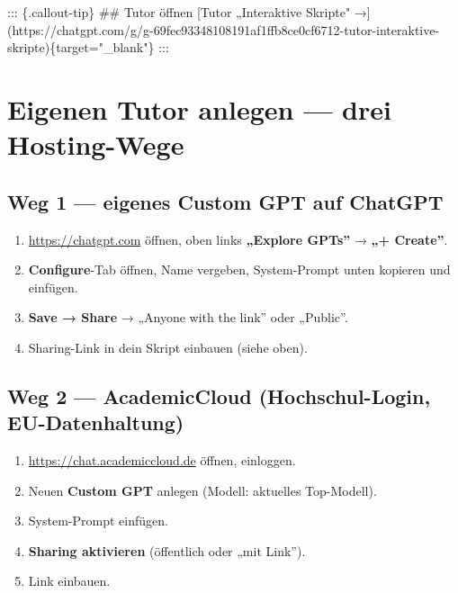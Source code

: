 \documentclass[
  ngerman,
  a4paper,
  DIV=11]{scrreprt}
\newenvironment{Shaded}{\begin{snugshade}}{\end{snugshade}}
\newcommand{\CommentTok}[1]{\textcolor[rgb]{0.37,0.37,0.37}{#1}}
\newcommand{\FunctionTok}[1]{\textcolor[rgb]{0.28,0.35,0.67}{#1}}
\newcommand{\NormalTok}[1]{\textcolor[rgb]{0.00,0.23,0.31}{#1}}
\newcommand{\OtherTok}[1]{\textcolor[rgb]{0.00,0.23,0.31}{#1}}
\providecommand{\tightlist}{%
  \setlength{\itemsep}{0pt}\setlength{\parskip}{0pt}}
\begin{document}
\begin{Shaded}
\begin{Highlighting}[]
\NormalTok{::: \{.callout{-}tip\}}
\FunctionTok{\#\# Tutor öffnen}
\CommentTok{[}\OtherTok{Tutor „Interaktive Skripte" →}\CommentTok{](https://chatgpt.com/g/g{-}69fec93348108191af1ffb8ce0cf6712{-}tutor{-}interaktive{-}skripte)}\NormalTok{\{target="\_blank"\}}
\NormalTok{:::}
\end{Highlighting}
\end{Shaded}

\section{Eigenen Tutor anlegen --- drei
Hosting-Wege}\label{eigenen-tutor-anlegen-drei-hosting-wege}

\subsection{Weg 1 --- eigenes Custom GPT auf
ChatGPT}\label{weg-1-eigenes-custom-gpt-auf-chatgpt}

\begin{enumerate}
\def\labelenumi{\arabic{enumi}.}
\tightlist
\item
  \url{https://chatgpt.com} öffnen, oben links \textbf{„Explore GPTs''}
  → \textbf{„+ Create''}.
\item
  \textbf{Configure}-Tab öffnen, Name vergeben, System-Prompt unten
  kopieren und einfügen.
\item
  \textbf{Save → Share} → „Anyone with the link'' oder „Public''.
\item
  Sharing-Link in dein Skript einbauen (siehe oben).
\end{enumerate}

\subsection{Weg 2 --- AcademicCloud (Hochschul-Login,
EU-Datenhaltung)}\label{weg-2-academiccloud-hochschul-login-eu-datenhaltung}

\begin{enumerate}
\def\labelenumi{\arabic{enumi}.}
\tightlist
\item
  \url{https://chat.academiccloud.de} öffnen, einloggen.
\item
  Neuen \textbf{Custom GPT} anlegen (Modell: aktuelles Top-Modell).
\item
  System-Prompt einfügen.
\item
  \textbf{Sharing aktivieren} (öffentlich oder „mit Link'').
\item
  Link einbauen.
\end{enumerate}
\end{document}
